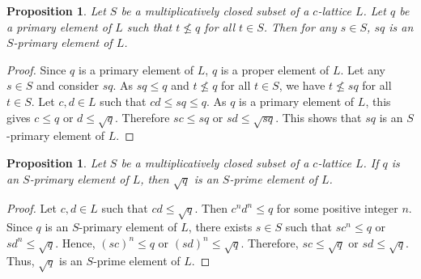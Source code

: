 \documentclass[10pt,twoside,a4paper]{amsart}
\numberwithin{equation}{section}
\theoremstyle{plain}
\newtheorem{prop}[lem]{Proposition}
\theoremstyle{definition}
\begin{document}

\begin{prop}%
	Let $S$ be a multiplicatively closed subset of a $c$-lattice $L$. Let $q$ be a primary element of $L$ such that $t \nleq q$ for all $t \in S$. Then for any $s \in S$, $sq$ is an $S$-primary element of $L$.
\end{prop}

\begin{proof}
	Since $q$ is a primary element of $L$, $q$ is a proper element of $L$. Let any $s \in S$ and consider $sq$. As $sq \leq q$ and $t \nleq q$ for all $t \in S$, we have $t \nleq sq$ for all $t \in S$. Let $ c, d \in L$ such that $cd \leq sq \leq q$. As $q$ is a primary element of $L$, this gives $c \leq q$ or $d \leq \sqrt{q}$. Therefore $sc \leq sq$ or $sd \leq \sqrt{sq}$. This shows that $sq$ is an $S$-primary element of $L$.
\end{proof}

\begin{prop}%
	Let $S$ be a multiplicatively closed subset of a $c$-lattice $L$.	If $q$ is an $S$-primary element of $L$, then $\sqrt q$ is an $S$-prime element of $L$.
\end{prop}

\begin{proof} 
	Let $c,d \in L$ such that $cd \leq \sqrt q$. Then $c^n d^n \leq q$ for some positive integer $n$. Since $q$ is an $S$-primary element of $L$,  there exists $s\in S$ such that $s c^n\leq q$ or $sd^n\leq \sqrt q$. Hence, $(sc)^n\leq q$ or $(sd)^n\leq \sqrt q$. Therefore, $sc\leq \sqrt q$ or $sd\leq \sqrt q$. Thus, $\sqrt q$ is an $S$-prime element of $L$.
\end{proof}	
\end{document}
